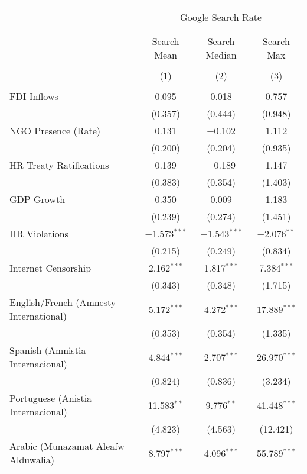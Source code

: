 
\begin{table}[!htbp] \centering 
  \caption{} 
  \label{} 
\begin{tabular}{@{\extracolsep{5pt}}lccc} 
\\[-1.8ex]\hline 
\hline \\[-1.8ex] 
 & \multicolumn{3}{c}{Google Search Rate} \\ 
\cline{2-4} 
\\[-1.8ex] & \multicolumn{3}{c}{ } \\ 
 & Search Mean & Search Median & Search Max \\ 
\\[-1.8ex] & (1) & (2) & (3)\\ 
\hline \\[-1.8ex] 
 FDI Inflows & 0.095 & 0.018 & 0.757 \\ 
  & (0.357) & (0.444) & (0.948) \\ 
  NGO Presence (Rate) & 0.131 & $-$0.102 & 1.112 \\ 
  & (0.200) & (0.204) & (0.935) \\ 
  HR Treaty Ratifications & 0.139 & $-$0.189 & 1.147 \\ 
  & (0.383) & (0.354) & (1.403) \\ 
  GDP Growth & 0.350 & 0.009 & 1.183 \\ 
  & (0.239) & (0.274) & (1.451) \\ 
  HR Violations & $-$1.573$^{***}$ & $-$1.543$^{***}$ & $-$2.076$^{**}$ \\ 
  & (0.215) & (0.249) & (0.834) \\ 
  Internet Censorship & 2.162$^{***}$ & 1.817$^{***}$ & 7.384$^{***}$ \\ 
  & (0.343) & (0.348) & (1.715) \\ 
  English/French (Amnesty International) & 5.172$^{***}$ & 4.272$^{***}$ & 17.889$^{***}$ \\ 
  & (0.353) & (0.354) & (1.335) \\ 
  Spanish (Amnistia Internacional) & 4.844$^{***}$ & 2.707$^{***}$ & 26.970$^{***}$ \\ 
  & (0.824) & (0.836) & (3.234) \\ 
  Portuguese (Anistia Internacional) & 11.583$^{**}$ & 9.776$^{**}$ & 41.448$^{***}$ \\ 
  & (4.823) & (4.563) & (12.421) \\ 
  Arabic (Munazamat Aleafw Alduwalia) & 8.797$^{***}$ & 4.096$^{***}$ & 55.789$^{***}$ \\ 

\end{tabular}
\end{table}
